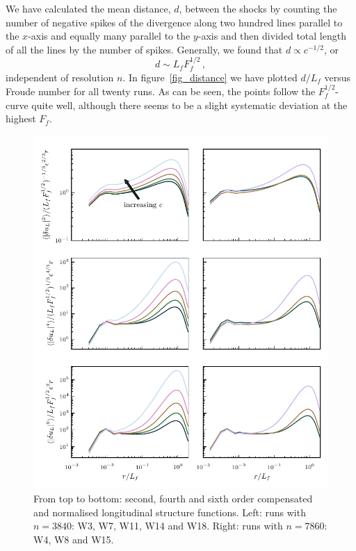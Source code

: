 \documentclass{jfm}
\begin{document}
We have calculated  the mean distance, $ d $, between the shocks by counting the number of negative spikes
of the divergence along two hundred lines parallel to the $ x $-axis and equally many 
parallel to the $ y $-axis and then divided total length of all the lines by
the number of spikes. Generally, we found that $ d \propto c^{-1/2} $, or
\begin{equation} \label{MeanDistance}
d \sim L_f F_f ^{1/2} \, ,
\end{equation}
independent of resolution $ n $. In figure~\ref{fig_distance} we have plotted
$ d/L_f $ versus Froude number for all twenty runs. As can be seen, the points
follow the $ F_f^{1/2} $-curve quite well, although there seems to be a slight
systematic deviation at the highest $ F_f $.
\begin{figure}
\centerline{
\includegraphics[width=5.0in]{../Pyfig/fig_struct_order_246}}
\caption{From top to bottom: second, fourth and sixth order compensated and
normalised longitudinal structure functions. Left: runs with $ n=3840 $: W3,
W7, W11, W14 and W18. Right: runs with $ n = 7860 $: W4, W8 and W15. }
\label{fig_StrucFunc}
\end{figure}
\end{document}
